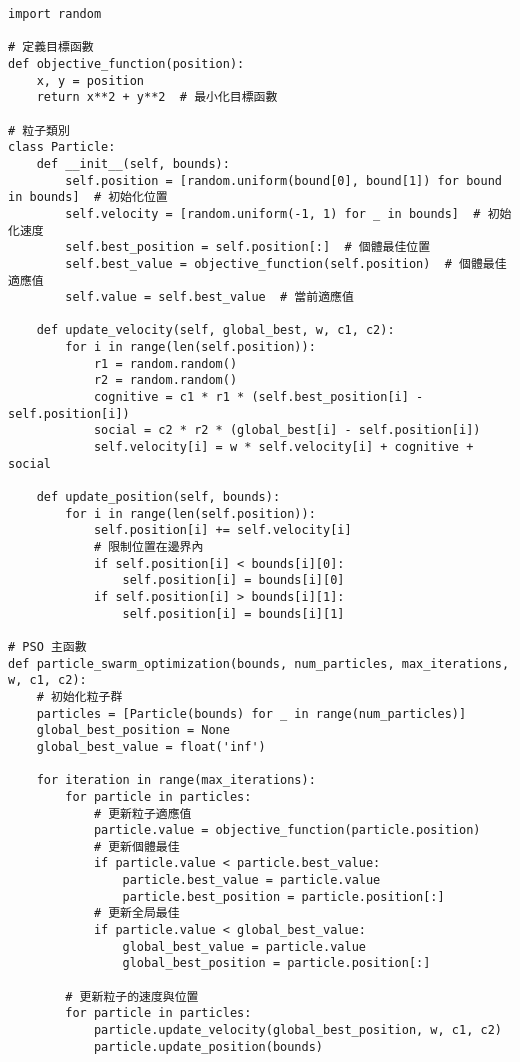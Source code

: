 \begin{verbatim}
import random

# 定義目標函數
def objective_function(position):
    x, y = position
    return x**2 + y**2  # 最小化目標函數

# 粒子類別
class Particle:
    def __init__(self, bounds):
        self.position = [random.uniform(bound[0], bound[1]) for bound in bounds]  # 初始化位置
        self.velocity = [random.uniform(-1, 1) for _ in bounds]  # 初始化速度
        self.best_position = self.position[:]  # 個體最佳位置
        self.best_value = objective_function(self.position)  # 個體最佳適應值
        self.value = self.best_value  # 當前適應值

    def update_velocity(self, global_best, w, c1, c2):
        for i in range(len(self.position)):
            r1 = random.random()
            r2 = random.random()
            cognitive = c1 * r1 * (self.best_position[i] - self.position[i])
            social = c2 * r2 * (global_best[i] - self.position[i])
            self.velocity[i] = w * self.velocity[i] + cognitive + social

    def update_position(self, bounds):
        for i in range(len(self.position)):
            self.position[i] += self.velocity[i]
            # 限制位置在邊界內
            if self.position[i] < bounds[i][0]:
                self.position[i] = bounds[i][0]
            if self.position[i] > bounds[i][1]:
                self.position[i] = bounds[i][1]

# PSO 主函數
def particle_swarm_optimization(bounds, num_particles, max_iterations, w, c1, c2):
    # 初始化粒子群
    particles = [Particle(bounds) for _ in range(num_particles)]
    global_best_position = None
    global_best_value = float('inf')

    for iteration in range(max_iterations):
        for particle in particles:
            # 更新粒子適應值
            particle.value = objective_function(particle.position)
            # 更新個體最佳
            if particle.value < particle.best_value:
                particle.best_value = particle.value
                particle.best_position = particle.position[:]
            # 更新全局最佳
            if particle.value < global_best_value:
                global_best_value = particle.value
                global_best_position = particle.position[:]

        # 更新粒子的速度與位置
        for particle in particles:
            particle.update_velocity(global_best_position, w, c1, c2)
            particle.update_position(bounds)


\end{verbatim}
